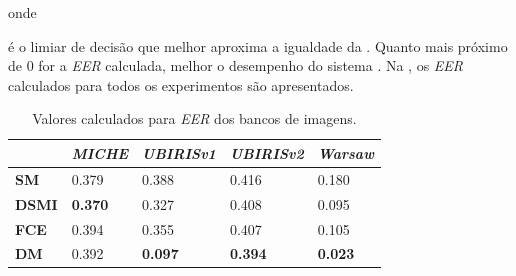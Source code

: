 
\noindent onde 


\noindent é o limiar de decisão que melhor aproxima a igualdade da . Quanto mais próximo de 0 for a \textit{\acrshort{EER}} calculada, melhor o desempenho do sistema \cite{d33BEAT}. Na , os \textit{\acrshort{EER}} calculados para todos os experimentos são apresentados.

\begin{table}[h!]
\centering
\caption{Valores calculados para \textit{\acrshort{EER}} dos bancos de imagens.}
\label{tab:experimentos:eer}
\begin{tabular}{l|l|l|l|l|}
\cline{2-5}
 & \textit{\textbf{MICHE}} & \textit{\textbf{UBIRISv1}} & \textit{\textbf{UBIRISv2}} & \textit{\textbf{Warsaw}} \\ \hline
\multicolumn{1}{|l|}{\textbf{SM}} & 0.379 & 0.388 & 0.416 & 0.180 \\ \hline
\multicolumn{1}{|l|}{\textbf{DSMI}} & \textbf{0.370} & 0.327 & 0.408 & 0.095 \\ \hline
\multicolumn{1}{|l|}{\textbf{FCE}} & 0.394 & 0.355 & 0.407 & 0.105 \\ \hline
\multicolumn{1}{|l|}{\textbf{DM}} & 0.392 & \textbf{0.097} & \textbf{0.394} & \textbf{0.023} \\ \hline
\end{tabular}
\end{table}

